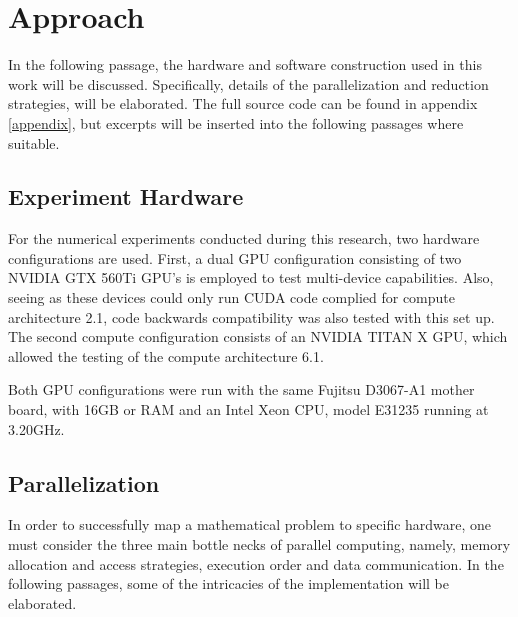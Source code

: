 \chapter{Approach}
\label{chapter:approach}

In the following passage, the hardware and software construction used
in this work will be discussed.  Specifically, details of the parallelization and
reduction strategies, will be elaborated.  The full source code can be found in
appendix \ref{appendix}, but excerpts will be inserted into the following passages
where suitable.

\section{Experiment Hardware}
For the numerical experiments conducted during this research, two hardware configurations
are used.  First, a dual GPU configuration consisting of two NVIDIA GTX 560Ti GPU's is
employed to test multi-device capabilities. Also, seeing as these devices
could only run \Gls{CUDA} code complied for compute architecture 2.1, code
backwards compatibility was also tested with this set up.
The second compute configuration consists of an NVIDIA TITAN X GPU, which allowed
the testing of the compute architecture 6.1.
\par
Both \Gls{GPU} configurations were run with the same Fujitsu D3067-A1 mother board,
with 16GB or RAM and an Intel Xeon CPU, model E31235 running at 3.20GHz.

\section{Parallelization}
In order to successfully map a mathematical problem to specific hardware, one must
consider the three main bottle necks of parallel computing, namely,
memory allocation and access strategies, execution order and data communication.
In the following passages, some of the intricacies of the implementation will be
elaborated.

